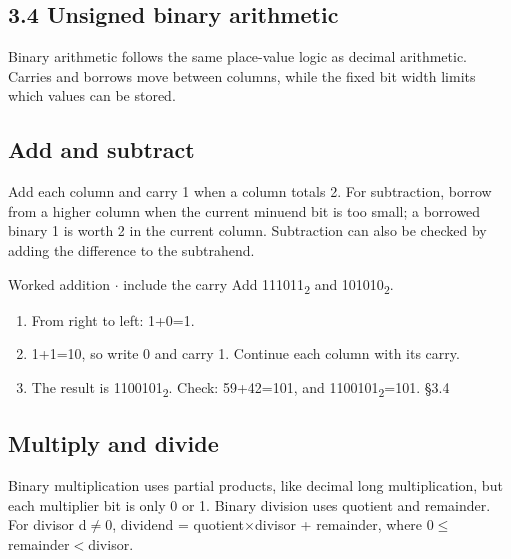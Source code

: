 \documentclass[11pt]{article}
\begin{document}
\begin{keepsection}
\section{3.4 Unsigned binary arithmetic}

Binary arithmetic follows the same place-value logic as decimal arithmetic. Carries and borrows move between columns, while the fixed bit width limits which values can be stored.

\begin{keepsection}
\subsection{Add and subtract}

Add each column and carry 1 when a column totals 2. For subtraction, borrow from a higher column when the current minuend bit is too small; a borrowed binary 1 is worth 2 in the current column. Subtraction can also be checked by adding the difference to the subtrahend.

\begin{workedbox}{Worked addition \ensuremath{\cdot} include the carry}
Add 111011\textsubscript{2} and 101010\textsubscript{2}.

\begin{enumerate}
\item From right to left: 1+0=1.
\item 1+1=10, so write 0 and carry 1. Continue each column with its carry.
\item The result is 1100101\textsubscript{2}. Check: 59+42=101, and 1100101\textsubscript{2}=101. \hfill{\small\color{FAUblue}§3.4}
\end{enumerate}
\end{workedbox}
\end{keepsection}

\begin{keepsection}
\subsection{Multiply and divide}

Binary multiplication uses partial products, like decimal long multiplication, but each multiplier bit is only 0 or 1. Binary division uses quotient and remainder. For divisor d\ensuremath{\neq}0, dividend = quotient\ensuremath{\times}divisor + remainder, where 0\ensuremath{\leq}remainder\ensuremath{<}divisor.


\end{keepsection}
\end{keepsection}
\end{document}
